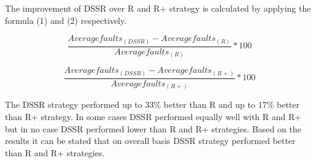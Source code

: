 The improvement of DSSR over R and R+ strategy is calculated by applying the formula (1) and (2) respectively.

\begin{equation} \frac{Averagefaults_{(DSSR)} - Averagefaults_{(R)}}{Averagefaults_{(R)}} * 100  \end{equation}

\begin{equation} \frac{Averagefaults_{(DSSR)} - Averagefaults_{(R+)}}{Averagefaults_{(R+)}}  * 100 \end{equation}

The DSSR strategy performed up to 33\% better than R and up to 17\% better than R+ strategy. In some cases DSSR performed equally well with R and R+ but in no case DSSR performed lower than R and R+ strategies. Based on the results it can be stated that on overall basis DSSR strategy performed better than R and R+ strategies. 

